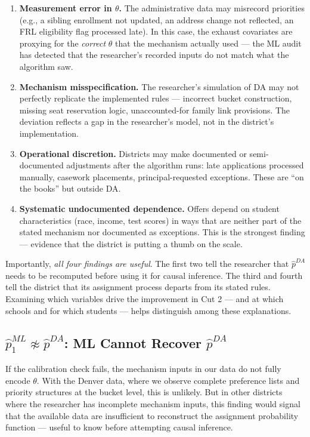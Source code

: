 \documentclass[12pt,a4paper,dvipsnames]{article}
\begin{document}
\begin{enumerate}
    \item \textbf{Measurement error in $\theta$.} The administrative data may misrecord priorities (e.g., a sibling enrollment not updated, an address change not reflected, an FRL eligibility flag processed late). In this case, the exhaust covariates are proxying for the \textit{correct} $\theta$ that the mechanism actually used --- the ML audit has detected that the researcher's recorded inputs do not match what the algorithm saw.

    \item \textbf{Mechanism misspecification.} The researcher's simulation of DA may not perfectly replicate the implemented rules --- incorrect bucket construction, missing seat reservation logic, unaccounted-for family link provisions. The deviation reflects a gap in the researcher's model, not in the district's implementation.

    \item \textbf{Operational discretion.} Districts may make documented or semi-documented adjustments after the algorithm runs: late applications processed manually, casework placements, principal-requested exceptions. These are ``on the books'' but outside DA.

    \item \textbf{Systematic undocumented dependence.} Offers depend on student characteristics (race, income, test scores) in ways that are neither part of the stated mechanism nor documented as exceptions. This is the strongest finding --- evidence that the district is putting a thumb on the scale.
\end{enumerate}

\noindent Importantly, \textit{all four findings are useful}. The first two tell the researcher that $\hat{p}^{DA}$ needs to be recomputed before using it for causal inference. The third and fourth tell the district that its assignment process departs from its stated rules. Examining which variables drive the improvement in Cut 2 --- and at which schools and for which students --- helps distinguish among these explanations.

\subsection{$\hat{p}^{ML}_1 \not\approx \hat{p}^{DA}$: ML Cannot Recover $\hat{p}^{DA}$}

If the calibration check fails, the mechanism inputs in our data do not fully encode $\theta$. With the Denver data, where we observe complete preference lists and priority structures at the bucket level, this is unlikely. But in other districts where the researcher has incomplete mechanism inputs, this finding would signal that the available data are insufficient to reconstruct the assignment probability function --- useful to know before attempting causal inference.
\end{document}
